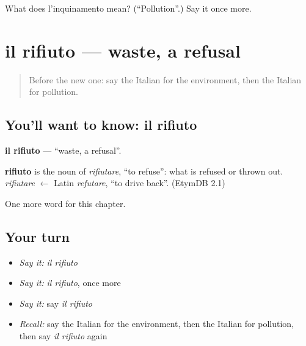 \begin{tcolorbox}[breakable,colback=teal!4,colframe=teal!35!black,title={Before you move on}]
What does l'inquinamento mean? (\textquotedblleft{}Pollution\textquotedblright{}.) Say it once more.
\end{tcolorbox}
\section[il rifiuto]{il rifiuto — waste, a refusal}

\label{lesson:IT-C169-rifiuto}



\begin{quote}
Before the new one: say the Italian for the environment, then the Italian for pollution.
\end{quote}

\subsection*{You'll want to know: il rifiuto}
\textbf{il rifiuto} — \textquotedblleft{}waste, a refusal\textquotedblright{}.

\begin{cousinweb}
\textbf{rifiuto} is the noun of \emph{rifiutare}, \textquotedblleft{}to refuse\textquotedblright{}: what is refused or thrown out. \emph{rifiutare} $\leftarrow$ Latin \emph{refutare}, \textquotedblleft{}to drive back\textquotedblright{}. (EtymDB 2.1)
\end{cousinweb}

\begin{grammarlens}[title={What you've built}]
One more word for this chapter.
\end{grammarlens}

\subsection*{Your turn}
\begin{itemize}
\raggedright
  \item \emph{Say it:} \emph{il rifiuto}
  \item \emph{Say it:} \emph{il rifiuto}, once more
  \item \emph{Say it:} say \emph{il rifiuto}
  \item \emph{Recall:} say the Italian for the environment, then the Italian for pollution, then say \emph{il rifiuto} again
\end{itemize}

